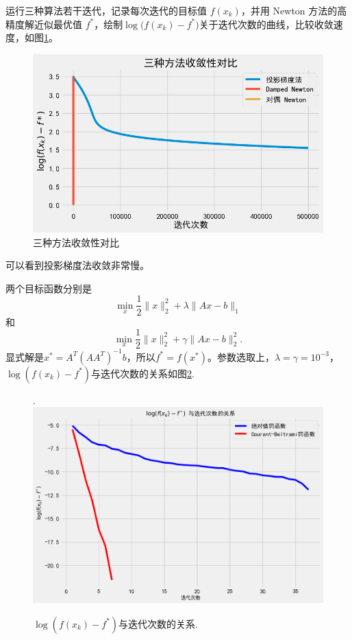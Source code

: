 \documentclass{homework}
\begin{document}
\begin{sol}
运行三种算法若干迭代，记录每次迭代的目标值 $f(x_k)$，并用 Newton 方法的高精度解近似最优值 $f^*$，绘制$ \log\bigl(f(x_k)-f^*\bigr)
$关于迭代次数的曲线，比较收敛速度，如图\ref{fig:2-1}。
\begin{figure}
    \centering
    \includegraphics[width=0.5\linewidth]{image.png}
    \caption{三种方法收敛性对比}
    \label{fig:2-1}
\end{figure}

可以看到投影梯度法收敛非常慢。

\end{sol}

\question

\begin{sol}
    两个目标函数分别是
    \[
    \min_x \frac 12 \|x\|_2^2+\lambda \|Ax-b\|_1
    \]
    和
    \[
    \min_x \frac 12 \|x\|_2^2+\gamma\|Ax-b\|_2^2.
    \]
显式解是$x^* = A^T(AA^T)^{-1}b$，所以$f^* = f(x^*)$。参数选取上，$\lambda = \gamma = 10^{-3}$，$\log (f(x_k) - f^*)$与迭代次数的关系如图\ref{fig:3-1}.
\begin{figure}.
    \centering
    \includegraphics[width=0.5\linewidth]{image2.png}
    \caption{$\log (f(x_k) - f^*)$与迭代次数的关系.}
    \label{fig:3-1}
\end{figure}
\end{sol}


% 
% 
\end{document}
